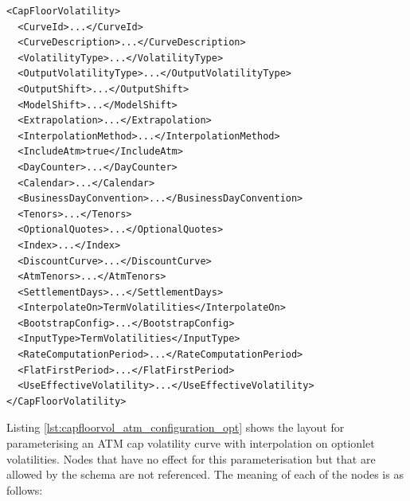 \begin{longlisting}
\begin{verbatim}
<CapFloorVolatility>
  <CurveId>...</CurveId>
  <CurveDescription>...</CurveDescription>
  <VolatilityType>...</VolatilityType>
  <OutputVolatilityType>...</OutputVolatilityType>
  <OutputShift>...</OutputShift>
  <ModelShift>...</ModelShift>
  <Extrapolation>...</Extrapolation>
  <InterpolationMethod>...</InterpolationMethod>
  <IncludeAtm>true</IncludeAtm>
  <DayCounter>...</DayCounter>
  <Calendar>...</Calendar>
  <BusinessDayConvention>...</BusinessDayConvention>
  <Tenors>...</Tenors>
  <OptionalQuotes>...</OptionalQuotes>
  <Index>...</Index>
  <DiscountCurve>...</DiscountCurve>
  <AtmTenors>...</AtmTenors>
  <SettlementDays>...</SettlementDays>
  <InterpolateOn>TermVolatilities</InterpolateOn>
  <BootstrapConfig>...</BootstrapConfig>
  <InputType>TermVolatilities</InputType>
  <RateComputationPeriod>...</RateComputationPeriod>
  <FlatFirstPeriod>...</FlatFirstPeriod>
  <UseEffectiveVolatility>...</UseEffectiveVolatility>
</CapFloorVolatility>
\end{verbatim}
\caption{ATM cap floor configuration with interpolation on term volatilities.}
\label{lst:capfloorvol_atm_configuration_term}
\end{longlisting}


Listing \ref{lst:capfloorvol_atm_configuration_opt} shows the layout for parameterising an ATM cap volatility curve with interpolation on optionlet volatilities. Nodes that have no effect for this parameterisation but that are allowed by the schema are not referenced. The meaning of each of the nodes is as follows:

